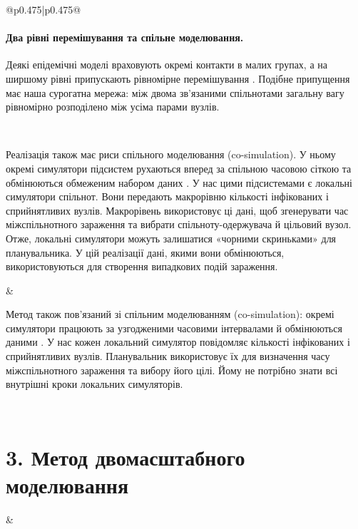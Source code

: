 ﻿\documentclass[11pt]{article}
\begin{document}
\begin{longtable}{@{}p{0.475\textwidth}|p{0.475\textwidth}@{}}
\begin{minipage}[t]{\linewidth}
\paragraph{Два рівні перемішування та спільне моделювання.}
Деякі епідемічні моделі враховують окремі контакти в малих групах, а на ширшому рівні припускають рівномірне перемішування \citep{ball1997}. Подібне припущення має наша сурогатна мережа: між двома зв'язаними спільнотами загальну вагу рівномірно розподілено між усіма парами вузлів.
\end{minipage} \\[5mm]
\begin{minipage}[t]{\linewidth}
Реалізація також має риси спільного моделювання (co-simulation). У ньому окремі симулятори підсистем рухаються вперед за спільною часовою сіткою та обмінюються обмеженим набором даних \citep{gomes2018cosim}. У нас цими підсистемами є локальні симулятори спільнот. Вони передають макрорівню кількості інфікованих і сприйнятливих вузлів. Макрорівень використовує ці дані, щоб згенерувати час міжспільнотного зараження та вибрати спільноту-одержувача й цільовий вузол. Отже, локальні симулятори можуть залишатися «чорними скриньками» для планувальника. У цій реалізації дані, якими вони обмінюються, використовуються для створення випадкових подій зараження.
\end{minipage} &
\begin{minipage}[t]{\linewidth}
Метод також пов'язаний зі спільним моделюванням (co-simulation): окремі симулятори працюють за узгодженими часовими інтервалами й обмінюються даними \citep{gomes2018cosim}. У нас кожен локальний симулятор повідомляє кількості інфікованих і сприйнятливих вузлів. Планувальник використовує їх для визначення часу міжспільнотного зараження та вибору його цілі. Йому не потрібно знати всі внутрішні кроки локальних симуляторів.
\end{minipage} \\[5mm]
\begin{minipage}[t]{\linewidth}
\section*{3. Метод двомасштабного моделювання}
\end{minipage} &
\begin{minipage}[t]{\linewidth}

\end{minipage}
\end{longtable}
\end{document}
